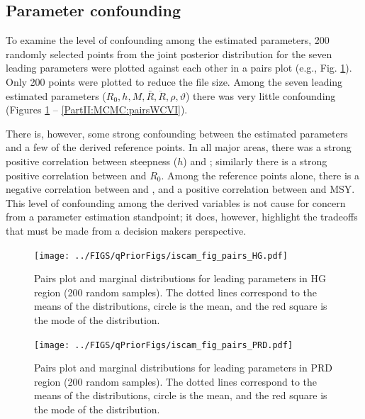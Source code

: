 \subsection{Parameter confounding}

To examine the level of confounding among the estimated parameters, 200 randomly selected points from the joint posterior distribution for the seven leading parameters were plotted against each other in a pairs plot (e.g., Fig. \ref{PartII:MCMC:pairsHG}). Only 200 points were plotted to reduce the file size.   Among the seven leading estimated parameters ($R_0,h,M,\bar{R},\ddot{R}, \rho, \vartheta$) there was very little confounding (Figures \ref{PartII:MCMC:pairsHG} -- \ref{PartII:MCMC:pairsWCVI}).

There is, however, some strong confounding between the estimated parameters and a few of the derived reference points.  In all major areas, there was a strong positive correlation between steepness ($h$) and \fmsy; similarly there is a strong positive correlation between \bo and $R_0$.  Among the reference points alone, there is a negative correlation between \bmsy and \fmsy, and a positive correlation between \fmsy and MSY.  This level of confounding among the derived variables is not cause for concern  from a parameter estimation standpoint; it does, however,  highlight the tradeoffs that must be made from a decision makers perspective.


\begin{figure}[!tbp]
	\texttt{[image: ../FIGS/qPriorFigs/iscam\_fig\_pairs\_HG.pdf]}\\
	\caption{Pairs plot and marginal distributions for leading parameters in HG region (200 random samples).  The dotted lines correspond to the means of the distributions, circle is the mean, and the red square is the mode of the distribution.}\label{PartII:MCMC:pairsHG}
\end{figure}


\begin{figure}[!tbp]
	\texttt{[image: ../FIGS/qPriorFigs/iscam\_fig\_pairs\_PRD.pdf]}\\
	\caption{Pairs plot and marginal distributions for leading parameters in PRD region (200 random samples).  The dotted lines correspond to the means of the distributions, circle is the mean, and the red square is the mode of the distribution.}\label{PartII:MCMC:pairsPRD}
\end{figure}

